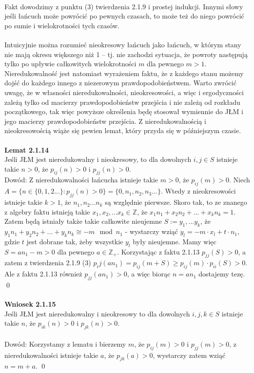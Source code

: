\documentclass[a4paper]{article}
\begin{document}
\\ Fakt dowodzimy z punktu (3) twierdzenia 2.1.9 i prostej indukcji. Innymi słowy jeśli łańcuch może powrócić po pewnych czasach, to może też do niego powrócić po sumie i wielokrotności tych czasów.
\\\\Intuicyjnie można rozumieć nieokresowy łańcuch jako łańcuch, w którym stany nie mają okresu większego niż 1 – tj. nie zachodzi sytuacja, że powroty następują tylko po upływie całkowitych wielokrotności $m$ dla pewnego $m>1$. Nieredukowalność jest natomiast wyrażeniem faktu, że z każdego stanu możemy dojść do każdego innego z niezerowym prawdopodobieństwem. Warto zwrócić uwagę, że w własności nieredukowalności, nieokresowości, a więc i ergodyczności zależą tylko od macierzy prawdopodobieństw przejścia i nie zależą od rozkładu początkowego, tak więc powyższe określenia będę stosował wymiennie do JŁM i jego macierzy prawdopodobieństw przejścia. Z nieredukowalnością i nieokresowością wiąże się pewien lemat, który przyda się w późniejszym czasie.
\\\\
\textbf{Lemat 2.1.14}\\
Jeśli JŁM jest nieredukowalny i nieokresowy, to dla dowolnych $i,j \in S$ istnieje takie $n > 0$, że $p_{ij}(n) > 0$ i $p_{jj}(n) > 0$.\\
Dowód: Z nieredukowalności łańcucha istnieje takie $m > 0$, że $p_{ij}(m) > 0$.  Niech $A = \{n \in \{0, 1, 2...\}:  p_{jj}(n) > 0\} = \{0, n_1, n_2, n_3 ... \}$. Wtedy z nieokresowości istnieje takie $k > 1$, że $n_1, n_2... n_k$ są względnie pierwsze. Skoro tak, to ze znanego z algebry faktu istnieją takie $x_1, x_2, ... x_k \in \mathbb{Z}$, że $x_1n_1 + x_2n_2 + ... + x_k n_k = 1$.  Zatem będą istniały także takie całkowite nieujemne $S := y_1, ... y_k$, że $y_1n_1 + y_2n_2 + ... + y_k n_k \cong -m \mod n_1$ - wystarczy wziąć $y_l = -m \cdot x_l + t \cdot n_1$, gdzie $t$ jest dobrane tak, żeby wszystkie $y_l$ były nieujemne. Mamy więc $S = an_1 - m > 0$ dla pewnego $a \in \mathbb{Z}_+$. Korzystając z faktu 2.1.13 $p_{jj}(S) > 0$, a zatem z twierdzenia 2.1.9 (3) $p_ij(an_1) = p_{ij}(m + S) \geq p_{ij}(m)\cdot p_{ii}(S) > 0$. Ale z faktu 2.1.13 również $p_{jj}(an_1) > 0$, a więc biorąc $n = an_1$ dostajemy tezę. \qed
\\\\
\textbf{Wniosek 2.1.15}\\
Jeśli JŁM jest nieredukowalny i nieokresowy to dla dowolnych $i,j,k \in S$ istnieje takie $n$, że $p_{ik}(n) > 0$ i $p_{jk}(n) > 0$.
\\\\ Dowód: Korzystamy z lematu i bierzemy $m$, że $p_{ij}(m) > 0$ i $p_{jj}(m) > 0$, z nieredukowalności istnieje takie $a$, że $p_{jk}(a) > 0$, wystarczy zatem wziąć $n = m + a$. \qed
\\\\
\end{document}
